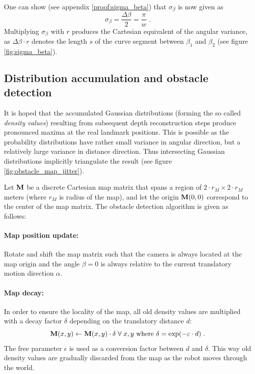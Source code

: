 One can show (see appendix \ref{proof:sigma_beta}) that $\sigma_\beta$ is now given as
\begin{equation}
 \sigma_\beta = \frac{\Delta \beta}2 = \frac{\pi}{w}
 \label{eqn:sigma_beta} \; .
\end{equation}
Multiplying $\sigma_\beta$ with $r$ produces the Cartesian equivalent of the angular variance, as $\Delta \beta \cdot r$ denotes the length $s$ of the curve segment between $\beta_1$ and $\beta_2$ (see figure \ref{fig:sigma_beta}).

\subsection{Distribution accumulation and obstacle detection}

\label{sec:obstacle_detection}

It is hoped that the accumulated Gaussian distributions (forming the so called \textit{density values}) resulting from subsequent depth reconstruction steps produce pronounced maxima at the real landmark positions. This is possible as the probability distributions have rather small variance in angular direction, but a relatively large variance in distance direction. Thus intersecting Gaussian distributions implicitly triangulate the result (see figure \ref{fig:obstacle_map_jitter}).

Let $\mathbf{M}$ be a discrete Cartesian map matrix that spans a region of $2 \cdot r_M \times 2 \cdot r_M$ meters (where $r_M$ is radius of the map), and let the origin $\mathbf{M}(0, 0)$ correspond to the center of the map matrix. The obstacle detection algorithm is given as follows:

\paragraph{Map position update:} Rotate and shift the map matrix such that the camera is always located at the map origin and the angle $\beta = 0$ is always relative to the current translatory motion direction $\alpha$.

\paragraph{Map decay:} In order to ensure the locality of the map, all old density values are multiplied with a decay factor $\delta$ depending on the translatory distance $d$:
\begin{equation}
 \mathbf{M}(x, y) \gets \mathbf{M}(x, y) \cdot \delta \; \forall \; x, y \text{ where } \delta = \exp(-\varepsilon \cdot d) \; .
 \label{eqn:map_decay}
\end{equation}
The free parameter $\epsilon$ is used as a conversion factor between $d$ and $\delta$. This way old density values are gradually discarded from the map as the robot moves through the world.

